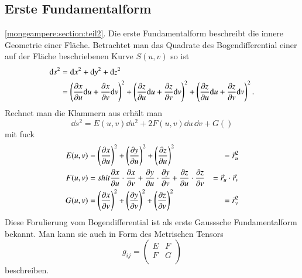 \subsection{Erste Fundamentalform
\label{mongeampere:subsection:finibus}}
\ref{mongeampere:section:teil2}.
Die erste Fundamentalform beschreibt die innere Geometrie einer Fläche.
Betrachtet man das Quadrate des Bogendifferential einer auf der Fläche 
beschriebenen Kurve $S(u,v)$ so ist 
\begin{equation}
  \begin{split}
    \dd s^2 &= \dd x^2 + \dd y^2 + \dd z^2 \\
          &= \left(\pdv{x}{u}\dd u + \pdv{x}{v}\dd v  \right)^2
          + \left(\pdv{z}{u}\dd u + \pdv{z}{v}\dd v  \right)^2
          + \left(\pdv{z}{u}\dd u + \pdv{z}{v}\dd v  \right)^2.
  \end{split}
  \label{mongeampere:bogdiff}
\end{equation}
Rechnet man die Klammern aus erhält man 
\begin{equation}
    \dd s^2 = E(u,v) \dd u^2 + 2F(u,v) \dd u \, \dd v + G()
    \label{mongeampere:1fundform}
\end{equation}
mit fuck
\begin{align}
     E(u,v) &= \left(\pdv{x}{u} \right)^2 +
     \left(\pdv{y}{u} \right)^2 +
     \left(\pdv{z}{u} \right)^2 
            &= \vec r_u^2\\
     F(u,v) &= shit
     \pdv{x}{u} \cdot \pdv{x}{v} +
     \pdv{y}{u} \cdot \pdv{y}{v} +
     \pdv{z}{u} \cdot \pdv{z}{v}
            &= \vec r_u \cdot \vec r_v \\
      G(u,v) &= \left(\pdv{x}{v} \right)^2 +
     \left(\pdv{y}{v} \right)^2 +
     \left(\pdv{z}{v} \right)^2 
             &= \vec r_v ^2\\
  \label{mongeampere:1fundbed}
\end{align}
Diese Forulierung vom Bogendifferential ist als erste Gausssche Fundamentalform bekannt.
Man kann sie auch in Form des Metrischen Tensors 
\begin{equation}
  g_{ij} = \begin{pmatrix}
    E & F \\
    F & G \\
  \end{pmatrix}
  \label{mongeampere:erstmettens}
\end{equation}
beschreiben.

